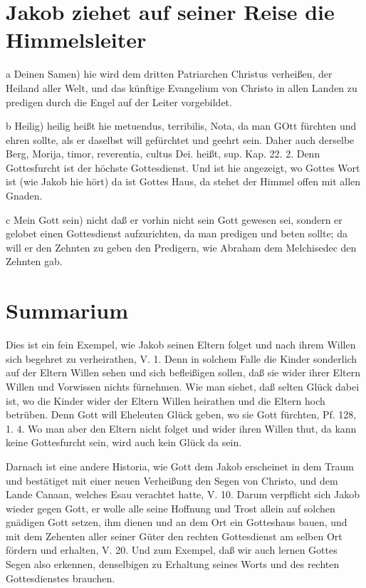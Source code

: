 \section{Jakob ziehet auf seiner Reise die Himmelsleiter}

a Deinen Samen) hie wird dem dritten Patriarchen Christus verheißen, der Heiland aller Welt, und das künftige Evangelium von Christo in allen Landen zu predigen durch die Engel auf der Leiter vorgebildet.

b Heilig) heilig heißt hie metuendus, terribilis, Nota, da man GOtt fürchten und ehren sollte, als er daselbst will gefürchtet und geehrt sein. Daher auch derselbe Berg, Morija, timor, reverentia, cultus Dei. heißt, sup. Kap. 22. 2. Denn Gottesfurcht ist der höchste Gottesdienst. Und ist hie angezeigt, wo Gottes Wort ist (wie Jakob hie hört) da ist Gottes Haus, da stehet der Himmel offen mit allen Gnaden.

c Mein Gott sein) nicht daß er vorhin nicht sein Gott gewesen sei, sondern er gelobet einen Gottesdienst aufzurichten, da man predigen und beten sollte; da will er den Zehnten zu geben den Predigern, wie Abraham dem Melchisedec den Zehnten gab.

\section{Summarium}

Dies ist ein fein Exempel, wie Jakob seinen Eltern folget und nach ihrem Willen sich begehret zu verheirathen, V. 1. Denn in solchem Falle die Kinder sonderlich auf der Eltern Willen sehen und sich befleißigen sollen, daß sie wider ihrer Eltern Willen und Vorwissen nichts fürnehmen. Wie man siehet, daß selten Glück dabei ist, wo die Kinder wider der Eltern Willen heirathen und die Eltern hoch betrüben. Denn Gott will Eheleuten Glück geben, wo sie Gott fürchten, Pf. 128, 1. 4. Wo man aber den Eltern nicht folget und wider ihren Willen thut, da kann keine Gottesfurcht sein, wird auch kein Glück da sein.

Darnach ist eine andere Historia, wie Gott dem Jakob erscheinet in dem Traum und bestätiget mit einer neuen Verheißung den Segen von Christo, und dem Lande Canaan, welches Esau verachtet hatte, V. 10. Darum verpflicht sich Jakob wieder gegen Gott, er wolle alle seine Hoffnung und Trost allein auf solchen gnädigen Gott setzen, ihm dienen und an dem Ort ein Gotteshaus
 bauen, und mit dem Zehenten aller seiner Güter den rechten Gottesdienst am selben Ort fördern und erhalten, V. 20. Und zum Exempel, daß wir auch lernen Gottes Segen also erkennen, denselbigen zu Erhaltung seines Worts und des rechten Gottesdienstes brauchen.

